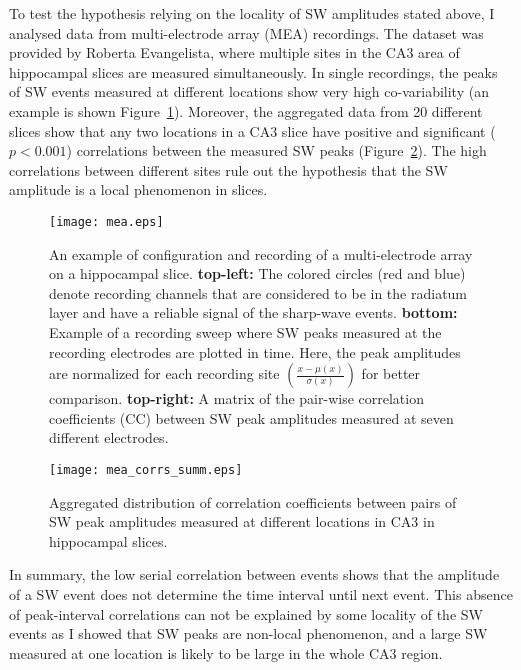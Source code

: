     To test the hypothesis relying on the locality of SW amplitudes stated
    above, I analysed data from multi-electrode array (MEA) recordings. The
    dataset was provided by Roberta Evangelista, where multiple sites in the
    CA3 area of hippocampal slices are measured simultaneously. In single
    recordings, the peaks of SW events measured at different locations show
    very high co-variability (an example is shown
    Figure~\ref{fig:peak_correlation_ex}). Moreover, the aggregated data from
    20 different slices show that any two locations in a CA3 slice have
    positive and significant ($p<0.001$) correlations between the measured SW
    peaks (Figure~\ref{fig:peak_correlation_summ}). The high correlations
    between different sites rule out the hypothesis that the SW amplitude is a
    local phenomenon in slices.

    \begin{figure}
      \texttt{[image: mea.eps]}
      \caption{
        An example of configuration and recording of a multi-electrode array on
        a hippocampal slice. \textbf{top-left:} The colored circles (red and
        blue) denote recording channels that are considered to be in the
        radiatum layer and have a reliable signal of the sharp-wave events.
        \textbf{bottom:} Example of a recording sweep where SW peaks measured
        at the recording electrodes are plotted in time. Here, the peak
        amplitudes are normalized for each recording site
        $\left(\frac{x-\mu(x)} {\sigma(x)}\right)$ for better comparison.
        \textbf{top-right:} A matrix of the pair-wise correlation coefficients
        (CC) between SW peak amplitudes measured at seven different electrodes.
      }
    \label{fig:peak_correlation_ex}
    \end{figure}

    \begin{figure}
    \centering
      \texttt{[image: mea\_corrs\_summ.eps]}
      \caption{
              Aggregated distribution of correlation coefficients between pairs
              of SW peak amplitudes measured at different locations in CA3 in
              hippocampal slices.
             }
    \label{fig:peak_correlation_summ}
    \end{figure}
    
    In summary, the low serial correlation between events shows that the
    amplitude of a SW event does not determine the time interval until next
    event. This absence of peak-interval correlations can not be explained by
    some locality of the SW events as I showed that SW peaks are non-local
    phenomenon, and a large SW measured at one location is likely to be large
    in the whole CA3 region.
    

